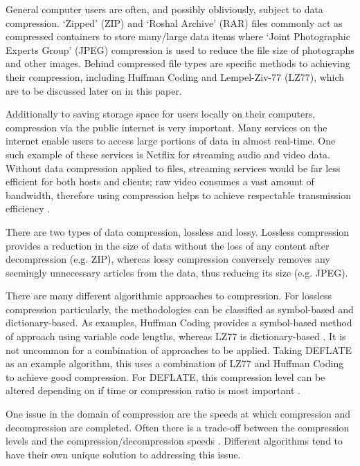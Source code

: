 \documentclass[12pt]{article}
\begin{document}
General computer users are often, and possibly obliviously, subject to data compression. `Zipped' (ZIP) and `Roshal Archive' (RAR) files commonly act as compressed containers to store many/large data items where `Joint Photographic Experts Group' (JPEG) compression is used to reduce the file size of photographs and other images. Behind compressed file types are specific methods to achieving their compression, including Huffman Coding and Lempel-Ziv-77 (LZ77), which are to be discussed later on in this paper.

Additionally to saving storage space for users locally on their computers, compression via the public internet is very important. Many services on the internet enable users to access large portions of data in almost real-time. One such example of these services is Netflix for streaming audio and video data. Without data compression applied to files, streaming services would be far less efficient for both hosts and clients; raw video consumes a vast amount of bandwidth, therefore using compression helps to achieve respectable transmission efficiency \citep{internet_video_streaming}. 

There are two types of data compression, lossless and lossy. Lossless compression provides a reduction in the size of data without the loss of any content after decompression (e.g. ZIP), whereas lossy compression conversely removes any seemingly unnecessary articles from the data, thus reducing its size (e.g. JPEG).

There are many different algorithmic approaches to compression. For lossless compression particularly, the methodologies can be classified as symbol-based and dictionary-based. As examples, Huffman Coding provides a symbol-based method of approach using variable code lengths, whereas LZ77 is dictionary-based \citep{dc_complete_ref}. It is not uncommon for a combination of approaches to be applied. Taking DEFLATE as an example algorithm, this uses a combination of LZ77 and Huffman Coding to achieve good compression. For DEFLATE, this compression level can be altered depending on if time or compression ratio is most important \citep{deflate_rfc}.

One issue in the domain of compression are the speeds at which compression and decompression are completed. Often there is a trade-off between the compression levels and the compression/decompression speeds \citep[p.~5]{dc_complete_ref}. Different algorithms tend to have their own unique solution to addressing this issue. 
\end{document}
